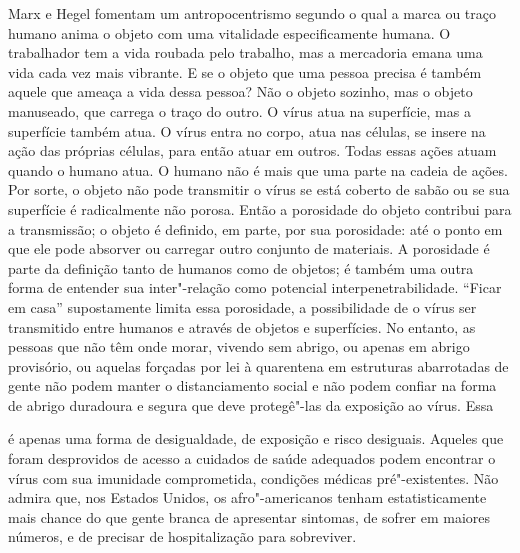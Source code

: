 \begin{multicols}{2}
Marx e Hegel fomentam um antropocentrismo segundo o qual a marca ou
traço humano anima o objeto com uma vitalidade especificamente humana. O
trabalhador tem a vida roubada pelo trabalho, mas a mercadoria emana uma
vida cada vez mais vibrante. E se o objeto que uma pessoa precisa é
também aquele que ameaça a vida dessa pessoa? Não o objeto sozinho, mas
o objeto manuseado, que carrega o traço do outro. O vírus atua na
superfície, mas a superfície também atua. O vírus entra no corpo, atua
nas células, se insere na ação das próprias células, para então atuar em
outros. Todas essas ações atuam quando o humano atua. O humano não é
mais que uma parte na cadeia de ações. Por sorte, o objeto não pode
transmitir o vírus se está coberto de sabão ou se sua superfície é
radicalmente não porosa. Então a porosidade do objeto contribui para a
transmissão; o objeto é definido, em parte, por sua porosidade: até o
ponto em que ele pode absorver ou carregar outro conjunto de materiais.
A porosidade é parte da definição tanto de humanos como de objetos; é
também uma outra forma de entender sua inter"-relação como potencial
interpenetrabilidade. ``Ficar em casa'' supostamente limita essa
porosidade, a possibilidade de o vírus ser transmitido entre humanos e
através de objetos e superfícies. No entanto, as pessoas que não têm
onde morar, vivendo sem abrigo, ou apenas em abrigo provisório, ou
aquelas forçadas por lei à quarentena em estruturas abarrotadas de gente
não podem manter o distanciamento social e não podem confiar na forma de
abrigo duradoura e segura que deve protegê"-las da exposição ao vírus.
Essa

\vspace{\baselineskip}

{\small{}}

\vspace{\baselineskip}

\noindent{}é apenas uma forma de desigualdade, de exposição e risco desiguais.
Aqueles que foram desprovidos de acesso a cuidados de saúde adequados
podem encontrar o vírus com sua imunidade comprometida, condições
médicas pré"-existentes. Não admira que, nos Estados Unidos, os
afro"-americanos tenham estatisticamente mais chance do que gente branca
de apresentar sintomas, de sofrer em maiores números, e de precisar de
hospitalização para sobreviver.



\end{multicols}
